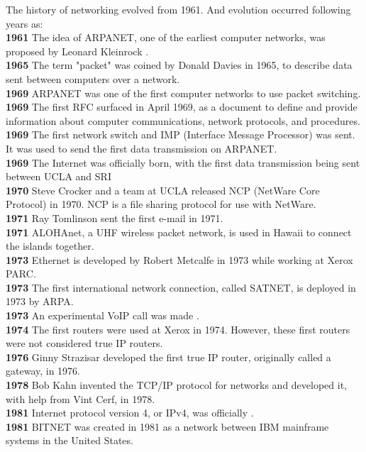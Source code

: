 \documentclass [12pt, a4paper]{article}
\begin{document}
The history of networking evolved from 1961. And evolution occurred following years as:\\
\textbf{1961}		The idea of ARPANET, one of the earliest computer networks, was proposed by Leonard Kleinrock .
\\ \textbf{1965}		The term "packet" was coined by Donald Davies in 1965, to describe data sent between computers over a network.
\\ \textbf{1969}		ARPANET was one of the first computer networks to use packet switching. 
\\ \textbf{1969}		The first RFC surfaced in April 1969, as a document to define and provide information about computer communications, network protocols, and procedures.
\\ \textbf{1969}		The first network switch and IMP (Interface Message Processor) was sent. It was used to send the first data transmission on ARPANET.
\\ \textbf{1969}		The Internet was officially born, with the first data transmission being sent between UCLA and SRI 
\\ \textbf{1970}		Steve Crocker and a team at UCLA released NCP (NetWare Core Protocol) in 1970. NCP is a file sharing protocol for use with NetWare.
\\ \textbf{1971}		Ray Tomlinson sent the first e-mail in 1971.
\\ \textbf{1971}		ALOHAnet, a UHF wireless packet network, is used in Hawaii to connect the islands together. 
\\ \textbf{1973}		Ethernet is developed by Robert Metcalfe in 1973 while working at Xerox PARC.
\\ \textbf{1973}		The first international network connection, called SATNET, is deployed in 1973 by ARPA.
\\ \textbf{1973}		An experimental VoIP call was made .
\\ \textbf{1974} 	The first routers were used at Xerox in 1974. However, these first routers were not considered true IP routers.
\\ \textbf{1976}		Ginny Strazisar developed the first true IP router, originally called a gateway, in 1976.
\\ \textbf{1978}		Bob Kahn invented the TCP/IP protocol for networks and developed it, with help from Vint Cerf, in 1978.
\\ \textbf{1981}		Internet protocol version 4, or IPv4, was officially .
\\ \textbf{1981}		BITNET was created in 1981 as a network between IBM mainframe systems in the United States.
\end{document}
